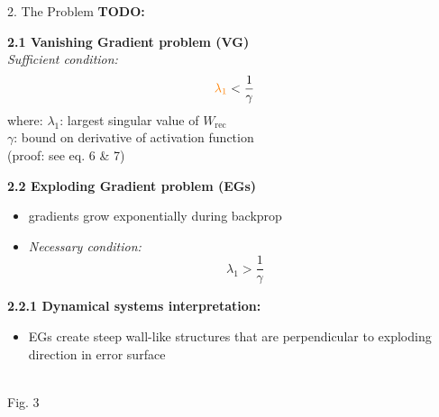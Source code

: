 \documentclass[final]{beamer}
\newcommand{\todo}[1]{\textcolor{myred}{\textbf{TODO:} #1}}
\begin{document}
\begin{frame}[t]
\begin{columns}[t,totalwidth=\textwidth]
        \begin{column}{0.33\textwidth}
            \begin{block}{2. The Problem} \todo{}
        
            \textbf{2.1 Vanishing Gradient problem (VG)}\\[0.3em]
            \textit{Sufficient condition:}
            \[
                \textcolor{orange}{\lambda_1} < \frac{1}{\gamma}
            \]
            where: $\lambda_1$: largest singular value of $W_{\text{rec}}$\\
            \phantom{where: }$\gamma$: bound on derivative of activation function\\[0.3em]
            (proof: see eq. 6 \& 7)
        
            \vspace{1em}
            \textbf{2.2 Exploding Gradient problem (EGs)}\\[-0.2em]
            \begin{itemize}
                \item gradients grow exponentially during backprop
                \item \textit{Necessary condition:}
                \[
                \lambda_1 > \frac{1}{\gamma}
                \]
            \end{itemize}
        
            \vspace{1em}
            \textbf{2.2.1 Dynamical systems interpretation:}
            \begin{itemize}
                \item EGs create steep wall-like structures 
                    that are perpendicular to exploding direction 
                    in error surface
            \end{itemize}
        
            \vspace{2em}
            \begin{center}
                \\[0.3em]
                Fig. 3
            \end{center}
        
            \end{block}
        \end{column}
  


\end{columns}
\end{frame}
\end{document}
